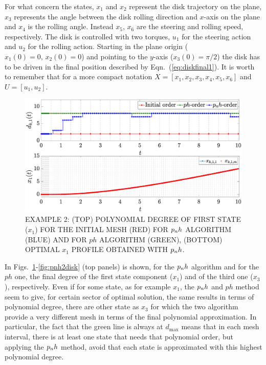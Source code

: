 For what concern the states, $x_1$ and $x_2$ represent the disk trajectory on the plane, $x_3$ represents the angle between the disk rolling direction and $x$-axis on the plane and $x_4$ is the rolling angle. Instead $x_5$, $x_6$ are the steering and rolling speed, respectively.
The disk is controlled with two torques, $u_1$ for the steering action and $u_2$ for the rolling action. Starting in the plane origin ($x_1(0) = 0, \, x_2(0) = 0$) and pointing to the $y$-axis ($x_3(0) = \pi/2$) the disk has to be driven in the final position described by
Eqn.~(\ref{eq:diskfinal1}). It is worth to remember that for a more compact notation $X = [x_1, x_2, x_3, x_4, x_5, x_6]$  and $U = [u_1, u_2]$.
\begin{figure}[t]
	\centering
	\includegraphics[trim={1cm 0.1cm 2cm 1.05cm},clip,width=1\columnwidth]{Img/pnh1_disk1}
	\caption{EXAMPLE 2: (TOP) POLYNOMIAL DEGREE OF FIRST STATE ($x_{1}$) FOR THE INITIAL MESH (RED) FOR $p_{n}h$ ALGORITHM (BLUE) AND FOR $ph$ ALGORITHM (GREEN), (BOTTOM)
		OPTIMAL $x_1$ PROFILE OBTAINED WITH $p_{n}h$.}
	\label{fig:pnh1disk}
\end{figure}
In Figs.~\ref{fig:pnh1disk}-\ref{fig:pnh2disk} (top panels) is shown, for the $p_{n}h$ algorithm and for the $ph$ one, the final degree of the first state component ($x_1$) and of the third one ($x_3$), respectively. Even if for some state, as for example $x_1$, the $p_{n}h$ and $ph$ method seem to give, for certain sector of optimal solution, the same results in terms of polynomial degree, there are other state as $x_3$ for which the two algorithm provide a very different mesh in terms of the final polynomial approximation.
In particular, the fact that the green line is always at $d_\text{max}$ means that in each mesh interval, there is at least one state that needs that polynomial order, but applying the $p_{n}h$ method, avoid that each state is approximated with this highest polynomial degree.
